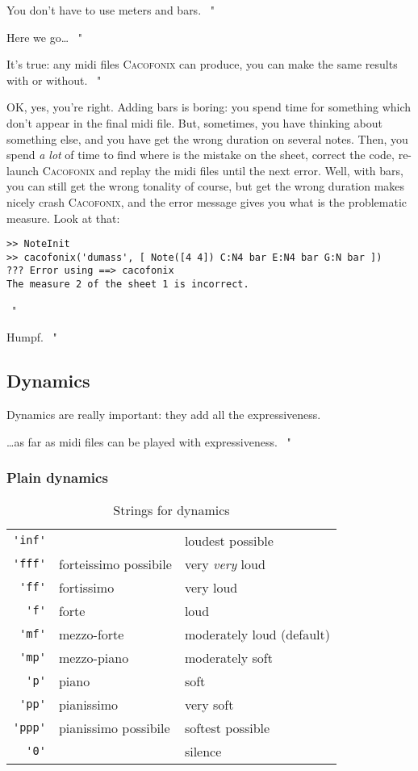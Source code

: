 \documentclass{article}
\newcommand\cacofonix{\textsc{Cacofonix}\xspace}
\newenvironment{meenv}{ \par \noindent \makebox[6em][r]{ \textcolor{mecolor}{Me}: " --~}}{~"}
\newenvironment{myselfenv}{ \par \noindent \makebox[6em][r]{ \textcolor{myselfcolor}{Myself}: " --~}}{~"}
\newcommand{ \me }[1]{%
\begin{meenv}%
	#1%
\end{meenv} }
\newcommand{ \myself }[1]{%
\begin{myselfenv}%
	#1%
\end{myselfenv} }
\begin{document}
\me{You don't have to use meters and bars.}
\myself{Here we go\dots}
\me{It's true: any midi files \cacofonix can produce, you can make the same results with or without.}
\begin{myselfenv}%
	OK, yes, you're right. Adding bars is boring: you spend time for something which don't appear in the final midi file. But, sometimes, you have thinking about something else, and you have get the wrong duration on several notes. Then, you spend \emph{a lot} of time to find where is the mistake on the sheet, correct the code, re-launch \cacofonix and replay the midi files until the next error. Well, with bars, you can still get the wrong tonality of course, but get the wrong duration makes nicely crash \cacofonix, and the error message gives you what is the problematic measure. Look at that:
\begin{lstlisting}
>> NoteInit
>> cacofonix('dumass', [ Note([4 4]) C:N4 bar E:N4 bar G:N bar ])
??? Error using ==> cacofonix
The measure 2 of the sheet 1 is incorrect.
\end{lstlisting}%
\end{myselfenv}
\me{Humpf.}

\subsection{Dynamics}
\label{sec:Dynamics}

Dynamics are really important: they add all the expressiveness.
\me{\dots as far as midi files can be played with expressiveness.}

\subsubsection{Plain dynamics}
\label{sec:PlainDynamics}

\begin{table}
	\centering
	\begin{tabular}{rll}
		\lstinline!'inf'! & & loudest possible \\
		\lstinline!'fff'! & forteissimo possibile & very \emph{very} loud \\
		\lstinline!'ff'! & fortissimo & very loud \\
		\lstinline!'f'! & forte & loud \\
		\lstinline!'mf'! & mezzo-forte & moderately loud (default) \\
		\lstinline!'mp'! & mezzo-piano & moderately soft \\
		\lstinline!'p'! & piano & soft \\
		\lstinline!'pp'! & pianissimo & very soft \\
		\lstinline!'ppp'! & pianissimo possibile & softest possible \\
		\lstinline!'0'! & & silence \\
	\end{tabular}
	\caption{Strings for dynamics}
	\label{tab:dynamics}
\end{table}
\end{document}
